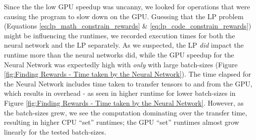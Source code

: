 \documentclass[12pt]{article}
\begin{document}
    Since the the low GPU speedup was uncanny, we looked for operations that were causing the program to slow down on the GPU. Guessing that the LP problem (Equations \ref{eq:lp_math_constrain_rewards} \& \ref{eq:lp_code_constrain_rewards}) might be influencing the runtimes, we recorded execution times for both the neural network and the LP separately. As we suspected, the LP \textit{did} impact the runtime more than the neural networks did, while the GPU speedup for the Neural Network was expectedly high with \textit{only} with large batch-sizes (Figure \ref{fig:Finding Rewards - Time taken by the Neural Network}). The time elapsed for the Neural Network includes time taken to transfer tensors to and from the GPU, which results in overhead - as seen in higher runtime for lower batch-sizes in Figure \ref{fig:Finding Rewards - Time taken by the Neural Network}. However, as the batch-sizes grew, we see the computation dominating over the transfer time, resulting in higher CPU ``set'' runtimes; the GPU ``set'' runtimes almost grow linearly for the tested batch-sizes.
\end{document}
